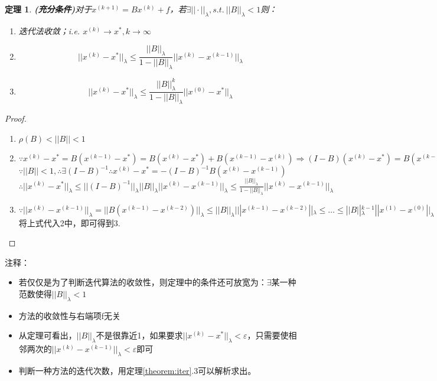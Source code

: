\documentclass[a4paper]{article}
\newtheorem{theorem}{定理}[section]
\begin{document}
\begin{theorem}
  \textbf{(充分条件)}对于$x^{(k+1)}=Bx^{(k)}+f $，若$\exists ||\cdot||_\lambda, s.t.\ ||B||_\lambda < 1$则：
  \begin{enumerate}
    \item 迭代法收敛；i.e. $x^{(k)}\rightarrow x^*, k\rightarrow \infty$
    \item $$||x^{(k)}-x^*||_\lambda \le \frac{||B||_\lambda}{1-||B||_\lambda}||x^{(k)}-x^{(k-1)}||_\lambda$$
    \item $$||x^{(k)}-x^*||_\lambda \le \frac{||B||^k_\lambda}{1-||B||_\lambda}||x^{(0)}-x^*||_\lambda$$
  \end{enumerate}
\end{theorem}
\begin{proof}
  \label{theorem:iter}
  \begin{enumerate}
    \item $\rho(B) < ||B|| < 1$
    \item $\because x^{(k)}-x^* = B(x^{(k-1)}-x^*)=B(x^{(k)}-x^*)+B(x^{(k-1)}-x^{(k)})
    \Rightarrow (I-B)(x^{(k)}-x^*)=B(x^{(k-1)}-x^{(k)})$\\
    $\because||B||<1, \therefore \exists (I-B)^{-1} 
    \therefore x^{(k)}-x^*=-(I-B)^{-1}B(x^{(k)}-x^{(k-1)}) $\\
    $\therefore ||x^{(k)}-x^*||_\lambda \le ||(I-B)^{-1}
    ||_\lambda||B||_\lambda||x^{(k)}-x^{(k-1)}||_\lambda\le \frac{||B||_\lambda}{1-||B||_\lambda}||x^{(k)}-x^{(k-1)}||_\lambda$
    \item $\because ||x^{(k)}-x^{(k-1)}||_\lambda =||B(x^{(k-1)}-x^{(k-2)})||_\lambda \le ||B||_\lambda|||x^{(k-1)}-x^{(k-2)}||_\lambda \le \dots \le ||B||^{k-1}_\lambda||x^{(1)}-x^{(0)}||_\lambda $\\
      将上式代入2中，即可得到3.
  \end{enumerate}
\end{proof}

注释：
\begin{itemize}
  \item 若仅仅是为了判断迭代算法的收敛性，则定理中的条件还可放宽为：$\exists$某一种范数使得$||B||_\lambda<1$
  \item 方法的收敛性与右端项f无关
  \item 从定理可看出，$||B||_\lambda$不是很靠近1，如果要求$||x^{(k)}-x^*||_\lambda<\varepsilon$，只需要使相邻两次的$||x^{(k)}-x^{(k-1)}||_\lambda < \varepsilon$即可
  \item 判断一种方法的迭代次数，用定理\ref{theorem:iter}.3可以解析求出。
\end{itemize}
\end{document}
